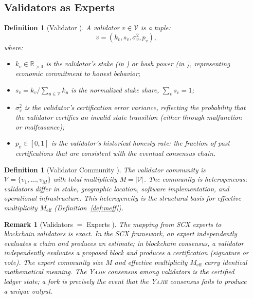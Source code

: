 \documentclass[11pt,a4paper]{article}
\newtheorem{definition}[theorem]{Definition}
\newtheorem{remark}[theorem]{Remark}
\theoremstyle{definition}
\newcommand{\Yajie}{\textsc{Yajie}}
\newcommand{\SCX}{\textsc{SCX}}
\newcommand{\R}{\mathbb{R}}
\newcommand{\validatorSet}{\mathcal{V}}
\newcommand{\PoW}{\mathrm{PoW}}
\newcommand{\PoS}{\mathrm{PoS}}
\begin{document}
\subsection{Validators as Experts}
\begin{definition}[Validator ]
\label{def:validator}
A validator $v \in \validatorSet$ is a tuple:
\begin{equation}
    v = (k_v, s_v, \sigma_v^2, p_v),
    \label{eq:validator}
\end{equation}
where:
\begin{itemize}
    \item $k_v \in \R_{>0}$ is the validator's stake (in \PoS{}) or hash power (in \PoW{}), representing economic commitment to honest behavior;
    \item $s_v = k_v / \sum_{u \in \validatorSet} k_u$ is the normalized stake share, $\sum_v s_v = 1$;
    \item $\sigma_v^2$ is the validator's certification error variance, reflecting the probability that the validator certifies an invalid state transition (either through malfunction or malfeasance);
    \item $p_v \in [0, 1]$ is the validator's historical honesty rate: the fraction of past certifications that are consistent with the eventual consensus chain.
\end{itemize}
\end{definition}
\begin{definition}[Validator Community ]
\label{def:validator_community}
The validator community is $\validatorSet = \{v_1, \ldots, v_M\}$ with total multiplicity $M = |\validatorSet|$. The community is heterogeneous: validators differ in stake, geographic location, software implementation, and operational infrastructure. This heterogeneity is the structural basis for effective multiplicity $M_{\mathrm{eff}}$ (Definition~\ref{def:meff}).
\end{definition}
\begin{remark}[Validators $=$ Experts ]
\label{rem:validators_experts}
The mapping from \SCX{} experts to blockchain validators is exact. In the \SCX{} framework, an expert independently evaluates a claim and produces an estimate; in blockchain consensus, a validator independently evaluates a proposed block and produces a certification (signature or vote). The expert community size $M$ and effective multiplicity $M_{\mathrm{eff}}$ carry identical mathematical meaning. The \Yajie{} consensus among validators is the certified ledger state; a fork is precisely the event that the \Yajie{} consensus fails to produce a unique output.
\end{remark}
\end{document}
